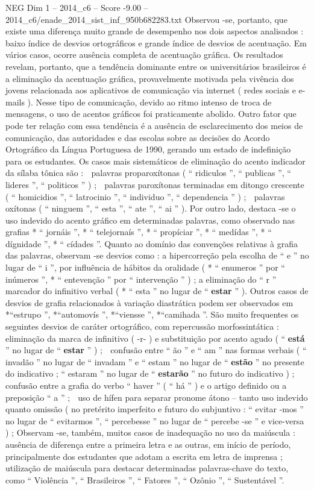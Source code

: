 \begin{textsample}{NEG Dim 1 – 2014\_c6 – Score -9.00 – 2014\_c6/enade\_2014\_sist\_inf\_950b682283.txt}
Observou -se, portanto, que existe uma diferença muito grande de desempenho nos dois aspectos analisados : baixo índice de desvios ortográficos e grande índice de desvios de acentuação.
Em vários casos, ocorre ausência completa de acentuação gráfica.
Os resultados revelam, portanto, que a tendência dominante entre os universitários brasileiros é a eliminação da acentuação gráfica, provavelmente motivada pela vivência dos jovens relacionada aos aplicativos de comunicação via internet ( redes sociais e e-mails ).
Nesse tipo de comunicação, devido ao ritmo intenso de troca de mensagens, o uso de acentos gráficos foi praticamente abolido.
Outro fator que pode ter relação com essa tendência é a ausência de esclarecimento dos meios de comunicação, das autoridades e das escolas sobre as decisões do Acordo Ortográfico da Língua Portuguesa de 1990, gerando um estado de indefinição para os estudantes.
Os casos mais sistemáticos de eliminação do acento indicador da sílaba tônica são :  palavras proparoxítonas ( “ ridiculos ”, “ publicas ”, “ lideres ”, “ politicos ” ) ;  palavras paroxítonas terminadas em ditongo crescente ( “ homicidios ”, “ latrocinio ”, “ individuo ”, “ dependencia ” ) ;  palavras oxítonas ( “ ninguem ”, “ esta ”, “ ate ”, “ ai ” ).
Por outro lado, destaca -se o uso indevido do acento gráfico em determinadas palavras, como observado nas grafias * “ jornáis ”, * “ telejornaís ”, * “ propíciar ”, * “ medídas ”, * “ dígnidade ”, * “ cídades ”.
Quanto ao domínio das convenções relativas à grafia das palavras, observam -se desvios como : a hipercorreção pela escolha de “ e ” no lugar de “ i ”, por influência de hábitos da oralidade ( * “ enumeros ” por “ inúmeros ”, * “ entevenção ” por “ intervenção ” ) ; a eliminação do “ r ” marcador do infinitivo verbal ( * “ esta ” no lugar de “ \textbf{estar} ” ).
Outros casos de desvios de grafia relacionados à variação diastrática podem ser observados em *“estrupo ”, *“automovís ”, *“viensse ”, *“camihada ”.
São muito frequentes os seguintes desvios de caráter ortográfico, com repercussão morfossintática :  eliminação da marca de infinitivo ( -r- ) e substituição por acento agudo ( “ \textbf{está} ” no lugar de “ \textbf{estar} ” ) ;  confusão entre “ ão ” e “ am ” nas formas verbais ( “ invadão ” no lugar de “ invadam ” e “ estam ” no lugar de “ \textbf{estão} ” no presente do indicativo ; “ estaram ” no lugar de “ \textbf{estarão} ” no futuro do indicativo ) ;  confusão entre a grafia do verbo “ haver ” ( “ há ” ) e o artigo definido ou a preposição “ a ” ;  uso de hífen para separar pronome átono – tanto uso indevido quanto omissão ( no pretérito imperfeito e futuro do subjuntivo : “ evitar -mos ” no lugar de “ evitarmos ”, “ percebesse ” no lugar de “ percebe -se ” e vice-versa ) ; Observam -se, também, muitos casos de inadequação no uso da maiúscula : ausência de diferença entre a primeira letra e as outras, em início de período, principalmente dos estudantes que adotam a escrita em letra de imprensa ; utilização de maiúscula para destacar determinadas palavras-chave do texto, como “ Violência ”, “ Brasileiros ”, “ Fatores ”, “ Ozônio ”, “ Sustentável ”.

\end{textsample}
